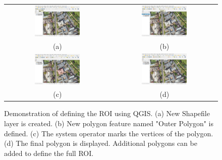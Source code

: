 \begin{figure}[h!]
    \centering
    \begin{tabular}{cc}
        \includegraphics[width=0.45\textwidth]{figs/Jihwan/qgis_a.png} &
        \includegraphics[width=0.45\textwidth]{figs/Jihwan/qgis_b.png} \\
        (a) & (b) \\[10pt]
        \includegraphics[width=0.45\textwidth]{figs/Jihwan/qgis_c.png} &
        \includegraphics[width=0.45\textwidth]{figs/Jihwan/qgis_d.png} \\
        (c) & (d)
    \end{tabular}
    \caption[Demonstration of ROI Definition using QGIS]
    {Demonstration of defining the \gls{ROI} using \gls{QGIS}. (a) New Shapefile layer is created. (b) New polygon feature named "Outer Polygon" is defined. (c) The system operator marks the vertices of the polygon. (d) The final polygon is displayed. Additional polygons can be added to define the full \gls{ROI}.}
    \label{fig:msp_qgis}
\end{figure}

